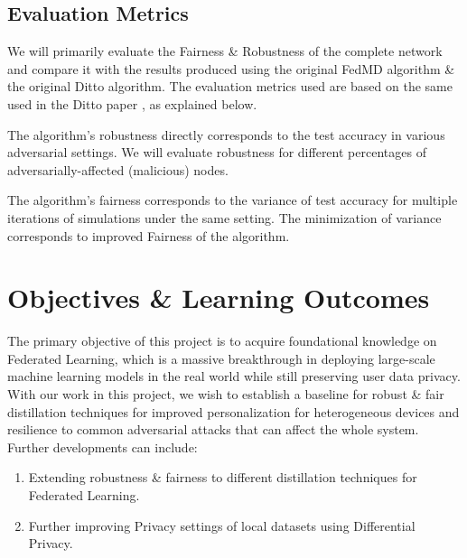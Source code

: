 \documentclass[conference]{IEEEtran}
\begin{document}
\subsection{Evaluation Metrics}
We will primarily evaluate the Fairness \& Robustness of the complete network and compare it with the results produced using the original FedMD algorithm \& the original Ditto algorithm. The evaluation metrics used are based on the same used in the Ditto paper \cite{b6}, as explained below. 

The algorithm's robustness directly corresponds to the test accuracy in various adversarial settings. We will evaluate robustness for different percentages of adversarially-affected (malicious) nodes. 

The algorithm's fairness corresponds to the variance of test accuracy for multiple iterations of simulations under the same setting. The minimization of variance corresponds to improved Fairness of the algorithm.

\section{Objectives \& Learning Outcomes}
The primary objective of this project is to acquire foundational knowledge on Federated Learning, which is a massive breakthrough in deploying large-scale machine learning models in the real world while still preserving user data privacy. \\
\newpage
With our work in this project, we wish to establish a baseline for robust \& fair distillation techniques for improved personalization for heterogeneous devices and resilience to common adversarial attacks that can affect the whole system. Further developments can include: 
\begin{enumerate}
\item Extending robustness \& fairness to different distillation techniques for Federated Learning.
\item Further improving Privacy settings of local datasets using Differential Privacy.
\end{enumerate}
\end{document}
